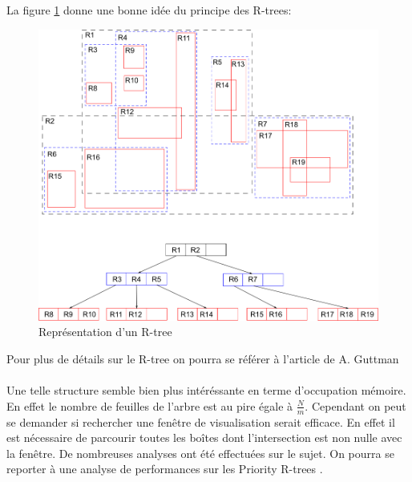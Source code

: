 La figure \ref{fig:rtree} donne une bonne idée du principe des R-trees\cite{wiki}:
\begin{figure}[htbp]
\centering
\includegraphics[scale=0.50]{rtree}
\caption{Représentation d'un R-tree}
\label{fig:rtree}
\end{figure}

Pour plus de détails sur le R-tree on pourra se référer à l'article de A. Guttman \cite{Guttman}

\paragraph{} Une telle structure semble bien plus intéréssante en terme d'occupation mémoire. En effet le nombre de feuilles de l'arbre est au pire égale à $\frac{N}{m}$. Cependant on peut se demander si rechercher une fenêtre de visualisation serait efficace. En effet il est nécessaire de parcourir toutes les boîtes dont l'intersection est non nulle avec la fenêtre. De nombreuses analyses ont été effectuées sur le sujet. On pourra se reporter à une analyse de performances sur les Priority R-trees \cite{PRTree}.

